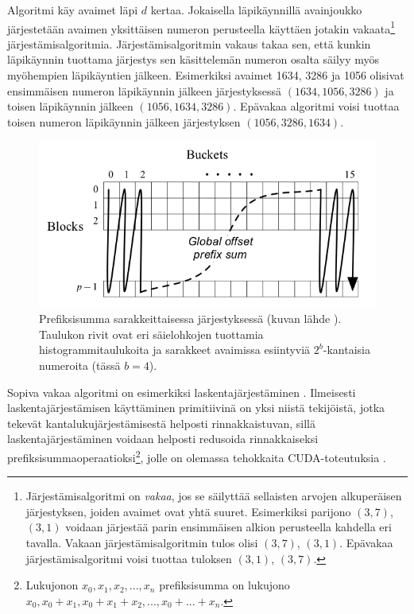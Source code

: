 \documentclass[a4paper,11pt]{article}
\begin{document}
Algoritmi käy avaimet läpi $d$ kertaa. Jokaisella läpikäynnillä avainjoukko järjestetään avaimen yksittäisen numeron perusteella käyttäen jotakin vakaata\footnote{Järjestämisalgoritmi on \emph{vakaa}, jos se säilyttää sellaisten arvojen alkuperäisen järjestyksen, joiden avaimet ovat yhtä suuret. Esimerkiksi parijono $(3, 7)$, $(3, 1)$ voidaan järjestää parin ensimmäisen alkion perusteella kahdella eri tavalla. Vakaan järjestämisalgoritmin tulos olisi $(3, 7)$, $(3, 1)$. Epävakaa järjestämisalgoritmi voisi tuottaa tuloksen $(3, 1)$, $(3, 7)$.} järjestämisalgoritmia. Järjestämisalgoritmin vakaus takaa sen, että kunkin läpikäynnin tuottama järjestys sen käsittelemän numeron osalta säilyy myös myöhempien läpikäyntien jälkeen. Esimerkiksi avaimet 1634, 3286 ja 1056 olisivat ensimmäisen numeron läpikäynnin jälkeen järjestyksessä $(1634, 1056, 3286)$ ja toisen läpikäynnin jälkeen $(1056, 1634, 3286)$. Epävakaa algoritmi voisi tuottaa toisen numeron läpikäynnin jälkeen järjestyksen $(1056, 3286, 1634)$.

\begin{figure}
\centering
\includegraphics[scale = 0.5]{prefixsum}
\caption{Prefiksisumma sarakkeittaisessa järjestyksessä (kuvan lähde \cite{satish2009}). Taulukon rivit ovat eri säielohkojen tuottamia histogrammitaulukoita ja sarakkeet avaimissa esiintyviä $2^b$-kantaisia numeroita (tässä $b = 4$).}
\label{fig:columnscan}
\end{figure}

Sopiva vakaa algoritmi on esimerkiksi laskentajärjestäminen \cite{clrs}. Ilmeisesti laskentajärjestämisen käyttäminen primitiivinä on yksi niistä tekijöistä, jotka tekevät kantalukujärjestämisestä helposti rinnakkaistuvan, sillä laskentajärjestäminen voidaan helposti redusoida rinnakkaiseksi prefiksisummaoperaatioksi\footnote{Lukujonon $x_0, x_1, x_2, ..., x_n$ prefiksisumma on lukujono $x_0, x_0 + x_1, x_0 + x_1 + x_2, ..., x_0 + ... + x_n$.}, jolle on olemassa tehokkaita CUDA-toteutuksia \cite{satish2009}.
\end{document}

